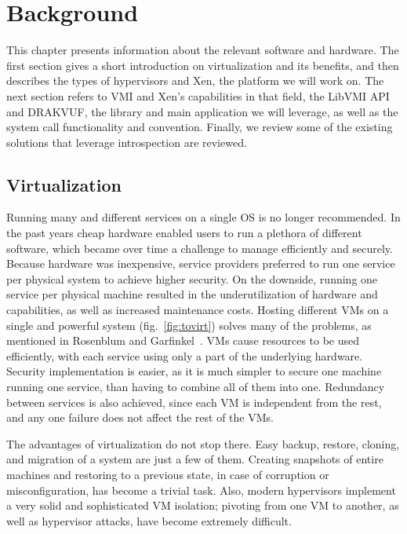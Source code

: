 
\chapter{Background}\label{ch:background}

This chapter presents information about the relevant software and hardware. The first section gives a short introduction on virtualization and its benefits, and then describes the types of hypervisors and Xen, the platform we will work on. The next section refers to \ac{VMI} and Xen's capabilities in that field, the LibVMI \ac{API} and DRAKVUF, the library and main application we will leverage, as well as the system call functionality and convention. Finally, we review some of the existing solutions that leverage introspection are reviewed.

\section{Virtualization}\label{sec:virtualization}
Running many and different services on a single \ac{OS} is no longer recommended. In the past years cheap hardware enabled users to run a plethora of different software, which became over time a challenge to manage efficiently and securely. Because hardware was inexpensive, service providers preferred to run one service per physical system to achieve higher security. On the downside, running one service per physical machine resulted in the underutilization of hardware and capabilities, as well as increased maintenance costs. Hosting different \ac{VM}s on a single and powerful system (fig.~\ref{fig:tovirt}) solves many of the problems, as mentioned in Rosenblum and Garfinkel~\cite{rosenblum2005virtual}. \ac{VM}s cause resources to be used efficiently, with each service using only a part of the underlying hardware. Security implementation is easier, as it is much simpler to secure one machine running one service, than having to combine all of them into one. Redundancy between services is also achieved, since each \ac{VM} is independent from the rest, and any one failure does not affect the rest of the \ac{VM}s.

\par The advantages of virtualization do not stop there. Easy backup, restore, cloning, and migration of a system are just a few of them. Creating snapshots of entire machines and restoring to a previous state, in case of corruption or misconfiguration, has become a trivial task. Also, modern hypervisors implement a very solid and sophisticated \ac{VM} isolation; pivoting from one \ac{VM} to another, as well as hypervisor attacks, have become extremely difficult.

